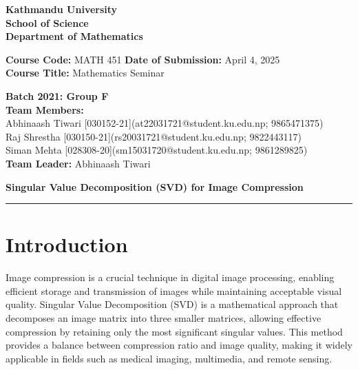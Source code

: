 \documentclass[a4paper,12pt]{article}
\begin{document}
\begin{center}
    \textbf{Kathmandu University}\\
    \textbf{School of Science}\\
    \textbf{Department of Mathematics}
\end{center}

\vspace{0.5cm}
\noindent\textbf{Course Code:} MATH 451 \hfill \textbf{Date of Submission:} April 4, 2025\\
\textbf{Course Title:} Mathematics Seminar

\vspace{1cm}

\noindent\textbf{Batch 2021: Group F}\\
\textbf{Team Members:}\\
Abhinaash Tiwari [030152-21](at22031721@student.ku.edu.np; 9865471375) \\
Raj Shrestha [030150-21](rs20031721@student.ku.edu.np; 9822443117)\\
Siman Mehta [028308-20](sm15031720@student.ku.edu.np; 9861289825)\\
\textbf{Team Leader:} Abhinaash Tiwari

\vspace{1cm}

\begin{center}
    \textbf{\Large Singular Value Decomposition (SVD) for Image Compression}
\end{center}

\hrule

\section{Introduction}
Image compression is a crucial technique in digital image processing, enabling efficient storage and transmission of images while maintaining acceptable visual quality. Singular Value Decomposition (SVD) is a mathematical approach that decomposes an image matrix into three smaller matrices, allowing effective compression by retaining only the most significant singular values. This method provides a balance between compression ratio and image quality, making it widely applicable in fields such as medical imaging, multimedia, and remote sensing.
\end{document}
